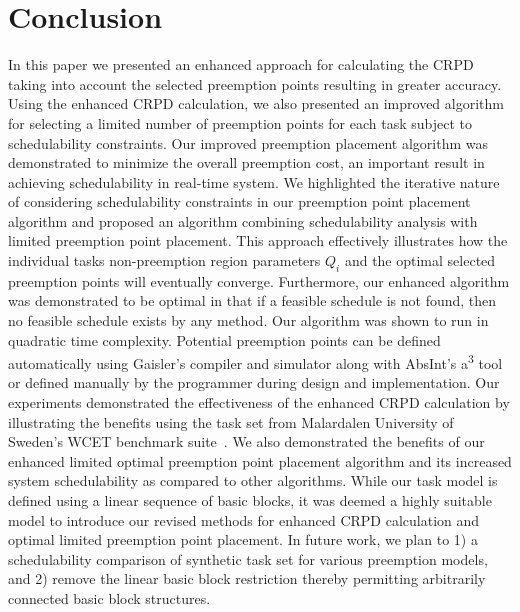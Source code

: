 \section{Conclusion}\label{sec:conclusion}

In this paper we presented an enhanced approach for calculating the 
CRPD taking into account the selected preemption points resulting 
in greater accuracy.  Using the enhanced CRPD calculation, we also
presented an improved algorithm for selecting a limited number of 
preemption points for each task subject to schedulability constraints.
Our improved preemption placement algorithm was demonstrated to
minimize the overall preemption cost, an important result in achieving
schedulability in real-time system.  We highlighted the iterative nature
of considering schedulability constraints in our preemption point 
placement algorithm and proposed an algorithm combining schedulability
analysis with limited preemption point placement.  This approach
effectively illustrates how the individual tasks non-preemption
region parameters $Q_i$ and the optimal selected preemption points will  
eventually converge.  Furthermore, our enhanced algorithm was demonstrated to be 
optimal in that if a feasible schedule is not found, then no feasible 
schedule exists by any method.  Our algorithm was shown to run in quadratic time
complexity.  Potential preemption points can be defined automatically
using Gaisler's compiler and simulator along with AbsInt's
a\textsuperscript{3} tool or defined manually by the programmer during design
and implementation. Our experiments demonstrated the effectiveness of 
the enhanced CRPD calculation by illustrating the benefits using the 
task set from Malardalen University of Sweden's WCET benchmark suite~\cite{mrtc:01}.
We also demonstrated the benefits of our enhanced limited optimal preemption
point placement algorithm and its increased system schedulability as 
compared to other algorithms.  While our task model is defined using a linear 
sequence of basic blocks, it was deemed a highly suitable model to introduce
our revised methods for enhanced CRPD calculation and optimal limited
preemption point placement.  In future work, we plan to 1) a schedulability comparison
of synthetic task set for various preemption models, and 2) remove the linear
basic block restriction thereby permitting arbitrarily connected basic
block structures.

